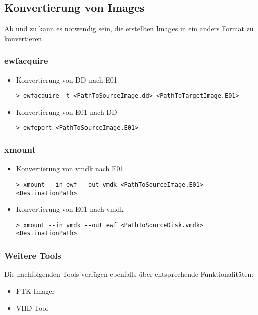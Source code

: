 \subsection{Konvertierung von Images}
Ab und zu kann es notwendig sein, die erstellten Images in ein anders Format zu konvertieren. 

\subsubsection{ewfacquire}
\begin{itemize}
\item Konvertierung von DD nach E01
\begin{lstlisting}
> ewfacquire -t <PathToSourceImage.dd> <PathToTargetImage.E01>
\end{lstlisting}

\item Konvertierung von E01 nach DD
\begin{lstlisting}
> ewfeport <PathToSourceImage.E01>
\end{lstlisting}
\end{itemize}


\subsubsection{xmount}
\begin{itemize}
\item Konvertierung von vmdk nach E01
\begin{lstlisting}
> xmount --in ewf --out vmdk <PathToSourceImage.E01> <DestinationPath>
\end{lstlisting}

\item Konvertierung von E01 nach vmdk
\begin{lstlisting}
> xmount --in vmdk --out ewf <PathToSourceDisk.vmdk> <DestinationPath>
\end{lstlisting}
\end{itemize}

\subsubsection{Weitere Tools}
Die nachfolgenden Tools verfügen ebenfalls über entsprechende Funktionalitäten:
\begin{itemize}
\item FTK Imager
\item VHD Tool
\end{itemize}



